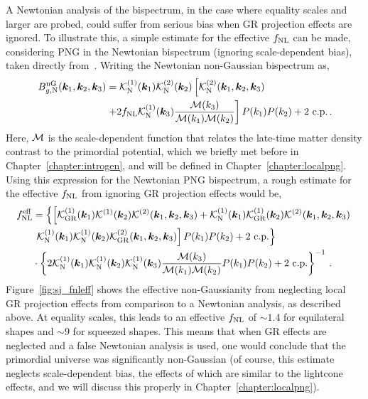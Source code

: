 A Newtonian analysis of the bispectrum, in the case where equality scales and larger are probed, could suffer from serious bias when GR projection effects are ignored. To illustrate this, a simple estimate for the effective $f_\text{NL}$ can be made, considering PNG in the Newtonian bispectrum (ignoring scale-dependent bias), taken directly from~\cite{Umeh:2016nuh}. Writing the Newtonian non-Gaussian bispectrum as, 
\begin{align}
	B_{g,\mathrm{N}}^\mathrm{nG}(\bm {k}_1,\bm {k}_2,\bm {k}_3) &= \mathcal{K}_{\mathrm{N}}^{(1)}(\bm {k}_1) \mathcal{K}_{\mathrm{N}}^{(2)}(\bm {k}_2) \left[ \mathcal{K}_{\mathrm{N}}^{(2)}(\bm {k}_1,\bm {k}_2,\bm {k}_3) \right. \nonumber \\
	&\left. + 2 f_\text{NL} \mathcal{K}_{\mathrm{N}}^{(1)}(\bm {k}_3) \frac{\mathcal{M}(k_3)}{\mathcal{M}(k_1)\mathcal{M}(k_2)} \right] P(k_1) P(k_2) + 2 \text{ c.p.}\,.
\end{align}
Here, $\mathcal{M}$ is the scale-dependent function that relates the late-time matter density contrast to the primordial potential, which we briefly met before in Chapter~\ref{chapter:introgen}, and will be defined in Chapter~\ref{chapter:localpng}. Using this expression for the Newtonian PNG bispectrum, a rough estimate for the effective $f_\text{NL}$ from ignoring GR projection effects would be,
\begin{align}
	f_\text{NL}^\mathrm{eff} &= \left\{ \left[ \mathcal{K}_{\mathrm{GR}}^{(1)}(\bm {k}_1) \mathcal{K}^{(1)}(\bm {k}_2) \mathcal{K}^{(2)}(\bm {k}_1,\bm {k}_2,\bm {k}_3) + \mathcal{K}_{\mathrm{N}}^{(1)}(\bm {k}_1) \mathcal{K}_{\mathrm{GR}}^{(1)}(\bm {k}_2) \mathcal{K}^{(2)}(\bm {k}_1,\bm {k}_2,\bm {k}_3) \right. \right. \nonumber \\
	&\left. \left. \mathcal{K}^{(1)}_{\mathrm{N}}(\bm {k}_1) \mathcal{K}^{(1)}_{\mathrm{N}}(\bm {k}_2) \mathcal{K}^{(2)}_{\mathrm{GR}}(\bm {k}_1,\bm {k}_2,\bm {k}_3) \right] P(k_1) P(k_2)  + 2 \text{ c.p.} \right\} \nonumber \\
	&\cdot \left\{ 2 \mathcal{K}_{\mathrm{N}}^{(1)}(\bm {k}_1) \mathcal{K}^{(1)}_{\mathrm{N}}(\bm {k}_2) \mathcal{K}^{(1)}_{\mathrm{N}}(\bm {k}_3) \frac{\mathcal{M}(k_3)}{\mathcal{M}(k_1)\mathcal{M}(k_2)} P(k_1) P(k_2) + 2 \text{ c.p.} \right\}^{-1}\,.
\end{align}
Figure~\ref{fig:sj_fnleff} shows the effective non-Gaussianity from neglecting local GR projection effects from comparison to a Newtonian analysis, as described above. At equality scales, this leads to an effective $f_\text{NL}$ of $\sim 1.4$ for equilateral shapes and $\sim 9$ for squeezed shapes. This means that when GR effects are neglected and a false Newtonian analysis is used, one would conclude that the primordial universe was significantly non-Gaussian (of course, this estimate neglects scale-dependent bias, the effects of which are similar to the lightcone effects, and we will discuss this properly in Chapter~\ref{chapter:localpng}).

